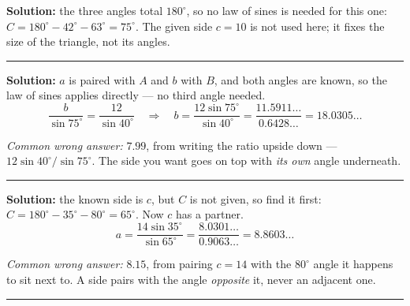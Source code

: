 \documentclass[12pt]{article}
\begin{document}



\textbf{Solution:} the three angles total $180^\circ$, so no law of sines is needed for this one:
$C = 180^\circ - 42^\circ - 63^\circ = 75^\circ$. The given side $c = 10$ is not used here; it fixes the size of the triangle, not its angles. 

\vspace{0.12cm}\noindent\rule{\linewidth}{0.2pt}\vspace{0.12cm}


\textbf{Solution:} $a$ is paired with $A$ and $b$ with $B$, and both angles are known, so the law of sines applies directly --- no third angle needed.
\[ \frac{b}{\sin 75^\circ} = \frac{12}{\sin 40^\circ} \quad\Longrightarrow\quad b = \frac{12\sin 75^\circ}{\sin 40^\circ} = \frac{11.5911\ldots}{0.6428\ldots} = 18.0305\ldots \]

\smallskip
\noindent\textit{Common wrong answer:} $7.99$, from writing the ratio upside down --- $12\sin 40^\circ / \sin 75^\circ$. The side you want goes on top with \emph{its own} angle underneath.

\vspace{0.12cm}\noindent\rule{\linewidth}{0.2pt}\vspace{0.12cm}


\textbf{Solution:} the known side is $c$, but $C$ is not given, so find it first:
$C = 180^\circ - 35^\circ - 80^\circ = 65^\circ$. Now $c$ has a partner.
\[ a = \frac{14\sin 35^\circ}{\sin 65^\circ} = \frac{8.0301\ldots}{0.9063\ldots} = 8.8603\ldots \]

\smallskip
\noindent\textit{Common wrong answer:} $8.15$, from pairing $c = 14$ with the $80^\circ$ angle it happens to sit next to. A side pairs with the angle \emph{opposite} it, never an adjacent one.

\vspace{0.12cm}\noindent\rule{\linewidth}{0.2pt}\vspace{0.12cm}

\end{document}
